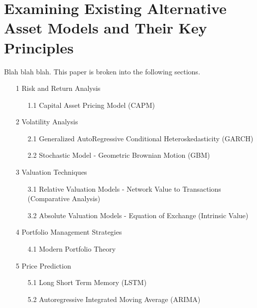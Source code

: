 \documentclass{ledger}
\begin{document}
\section{Examining Existing Alternative Asset Models and Their Key Principles}

Blah blah blah. This paper is broken into the following sections.
\begin{itemize}
       \item[1] Risk and Return Analysis
            \begin{itemize}
            \item[1.1] Capital Asset Pricing Model (CAPM)
            \end{itemize}
       \item[2] Volatility Analysis
            \begin{itemize}
            \item[2.1] Generalized AutoRegressive Conditional Heteroskedasticity (GARCH)
            \item[2.2] Stochastic Model - Geometric Brownian Motion (GBM)
            \end{itemize}
       \item[3] Valuation Techniques
            \begin{itemize}
            \item[3.1] Relative Valuation Models - Network Value to Transactions (Comparative Analysis)
            \item[3.2] Absolute Valuation Models - Equation of Exchange (Intrinsic Value)
            \end{itemize}
       \item[4] Portfolio Management Strategies
            \begin{itemize}
            \item[4.1] Modern Portfolio Theory
            \end{itemize}
       \item[5] Price Prediction
           \begin{itemize}
           \item[5.1] Long Short Term Memory (LSTM)
           \item[5.2] Autoregressive Integrated Moving Average (ARIMA)
           \end{itemize}
\end{itemize}
\end{document}
